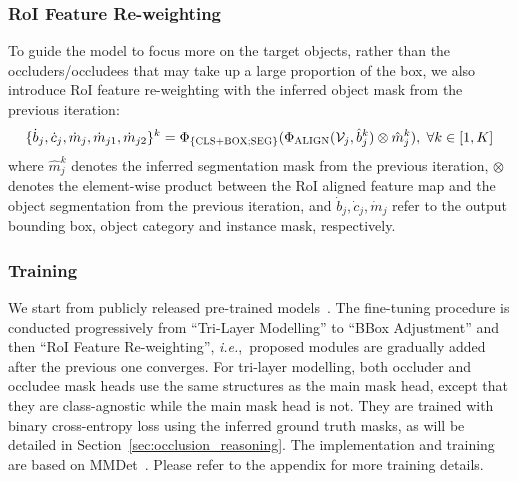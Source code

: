 \documentclass{bmvc2k}
\begin{document}
\vspace{-0.2cm}
\subsubsection{RoI Feature Re-weighting} 
\label{sec:weighted_RoI_pooling}
\vspace{-0.1cm}

To guide the model to focus more on the target objects, 
rather than the occluders/occludees that may take up a large proportion of the box, 
we also introduce RoI feature re-weighting with the inferred object mask from the previous iteration:
\begin{align}
   \{\dot{b}_j, \dot{c}_j, \dot{m}_j, \dot{m}_{j1}, \dot{m}_{j2}\}^k = \Phi_{\{\textsc{CLS+BOX;SEG}\}}  (\Phi_{\textsc{ALIGN}}(\mathcal{V}_j, \hat{b}_j^k) \otimes \hat{m}_j^k), \hspace{3pt} \forall k \in [1,K]
\end{align}
where $\hat{m}_j^k$ denotes the inferred segmentation mask from the previous iteration, 
$\otimes$ denotes the element-wise product between the RoI aligned feature map and the object segmentation from the previous iteration, and $\dot{b}_j, \dot{c}_j, \dot{m}_j$ refer to the output bounding box, 
object category and instance mask, respectively.

\vspace{-0.2cm}
\subsubsection{Training} 
\vspace{-0.1cm}
\label{sec:method_training}

We start from publicly released pre-trained models~\cite{swin_object_detection_github}. The fine-tuning procedure is conducted progressively from ``Tri-Layer Modelling'' to ``BBox Adjustment'' and then ``RoI Feature Re-weighting'', {\em i.e.},~proposed modules are gradually added after the previous one converges. 
For tri-layer modelling, both occluder and occludee mask heads use the same structures as the main mask head, except that they are class-agnostic while the main mask head is not. They are trained with binary cross-entropy loss using the inferred ground truth masks, as will be detailed in Section~\ref{sec:occlusion_reasoning}. 
The implementation and training are based on MMDet~\cite{mmdetection}.
Please refer to the appendix for more training details.

  \vspace{-0.2cm}
\end{document}
